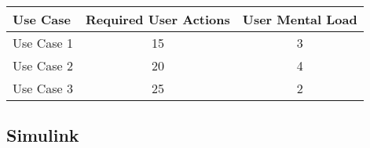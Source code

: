


\begin{tabularx}{\textwidth}{Xcc}
\textbf{Use Case} & \textbf{Required User Actions} & \textbf{User Mental Load}\\
\hline
Use Case 1                          & 15 & 3 \\
Use Case 2                          & 20 & 4 \\
Use Case 3                          & 25 & 2
\end{tabularx}

\subsection{Simulink}




